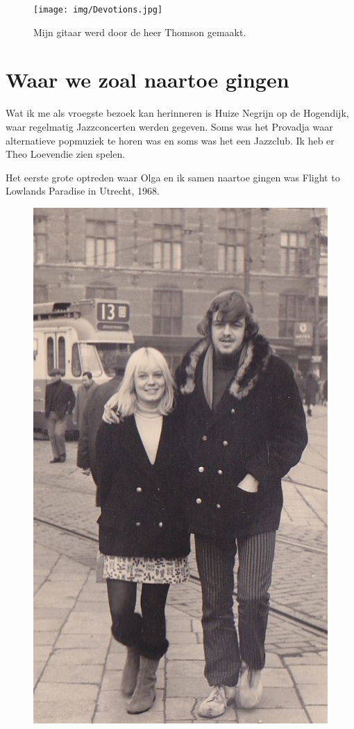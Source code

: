 \documentclass[10pt,twoside, openright]{memoir}
\begin{document}
\begin{figure}
\texttt{[image: img/Devotions.jpg]}
\caption*{\footnotesize Mijn gitaar werd door de heer Thomson gemaakt.}
\end{figure} 

\section{Waar we zoal naartoe gingen} %
\label{cha:naartoegaan}

Wat ik me als vroegste bezoek kan herinneren is Huize Negrijn op de Hogendijk, waar regelmatig Jazzconcerten werden gegeven. Soms was het Provadja waar alternatieve popmuziek te horen was en soms was het een Jazzclub. Ik heb er Theo Loevendie zien spelen.

Het eerste grote optreden waar Olga en ik samen naartoe gingen was Flight to Lowlands Paradise in Utrecht, 1968.

\begin{figure}
\includegraphics[width=\textwidth]{img/180ohjeugd}
\end{figure} 
\end{document}
